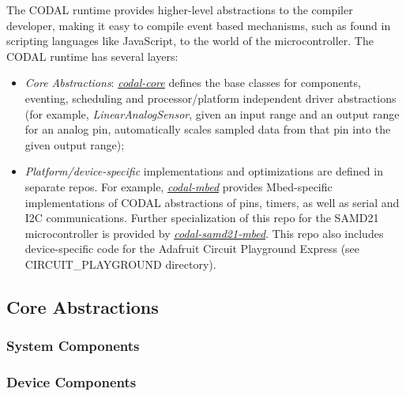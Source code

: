 The CODAL runtime provides higher-level abstractions to the compiler developer, making it
easy to compile event based mechanisms, such as found in scripting languages like JavaScript, to the world of the
microcontroller.   The CODAL runtime has several layers:
\begin{itemize}

\item \emph{Core Abstractions}:
\emph{\href{https://www.github.com/lancaster-university/codal-core}{codal-core}} defines the base classes for
components, eventing, scheduling and processor/platform independent driver abstractions (for example,
\emph{LinearAnalogSensor}, given an input range and an output range for an analog pin, automatically scales sampled data 
from that pin into the given output range);

\item \emph{Platform/device-specific} implementations and optimizations are defined in separate repos. For example, 
\emph{\href{https://www.github.com/lancaster-university/codal-mbed}{codal-mbed}}
provides Mbed-specific implementations of CODAL abstractions of pins, timers, as well as serial and I2C
communications. Further specialization of this repo for the SAMD21 microcontroller is provided by 
\emph{\href{https://www.github.com/lancaster-university/codal-samd21-mbed}{codal-samd21-mbed}}. 
This repo also includes device-specific code for the Adafruit Circuit Playground Express (see CIRCUIT\_PLAYGROUND
directory).

\end{itemize}


\subsection{Core Abstractions}

\subsubsection{System Components}



\subsubsection{Device Components}


